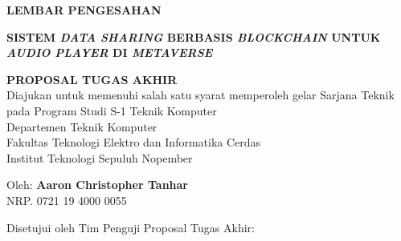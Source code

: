 \begin{center}
  \large
  \textbf{LEMBAR PENGESAHAN}
\end{center}

\thispagestyle{empty}

\begin{center}
  \textbf{SISTEM \emph{DATA SHARING} BERBASIS \emph{BLOCKCHAIN} UNTUK \emph{AUDIO PLAYER}
    DI \emph{METAVERSE}}
\end{center}

\begingroup
\small

\begin{center}
  \textbf{PROPOSAL TUGAS AKHIR} \\
  Diajukan untuk memenuhi salah satu syarat memperoleh gelar
  Sarjana Teknik pada
  Program Studi S-1 Teknik Komputer \\
  Departemen Teknik Komputer \\
  Fakultas Teknologi Elektro dan Informatika Cerdas \\
  Institut Teknologi Sepuluh Nopember
\end{center}

\begin{center}
  Oleh: \textbf{Aaron Christopher Tanhar} \\
  NRP. 0721 19 4000 0055
\end{center}

\begin{center}
  Disetujui oleh Tim Penguji Proposal Tugas Akhir:
\end{center}

\begingroup
\setlength{\tabcolsep}{0pt}

